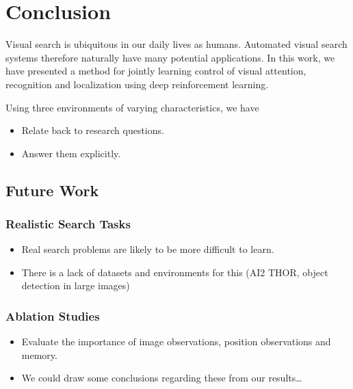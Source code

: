 \chapter{Conclusion}
\label{cha:conclusion}

Visual search is ubiquitous in our daily lives as humans.
Automated visual search systems therefore naturally have many potential applications.
In this work, we have presented a method for jointly learning control of visual attention, recognition and localization using deep reinforcement learning.

Using three environments of varying characteristics, we have


\begin{itemize}
    \item Relate back to research questions.
    \item Answer them explicitly.
\end{itemize}


\section{Future Work}

\subsection{Realistic Search Tasks}

\begin{itemize}
    \item Real search problems are likely to be more difficult to learn.
    \item There is a lack of datasets and environments for this (AI2 THOR, object detection in large images)
\end{itemize}

\subsection{Ablation Studies}

\begin{itemize}
    \item Evaluate the importance of image observations, position observations and memory.
    \item We could draw some conclusions regarding these from our results\dots
\end{itemize}